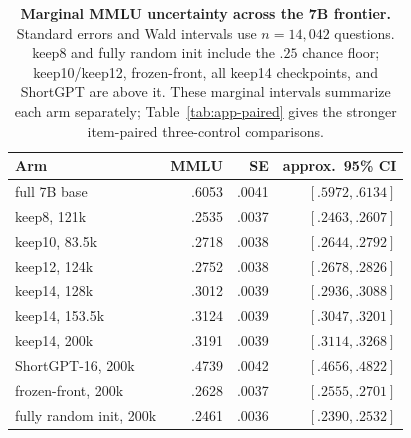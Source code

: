 \begin{table}[t]
\centering
\scriptsize
\setlength{\tabcolsep}{3pt}
\begin{tabular}{@{}lrrr@{}}
\toprule
\textbf{Arm} & \textbf{MMLU} & \textbf{SE} & \textbf{approx.\ 95\% CI} \\
\midrule
full 7B base & .6053 & .0041 & $[.5972,.6134]$ \\
keep8, 121k & .2535 & .0037 & $[.2463,.2607]$ \\
keep10, 83.5k & .2718 & .0038 & $[.2644,.2792]$ \\
keep12, 124k & .2752 & .0038 & $[.2678,.2826]$ \\
keep14, 128k & .3012 & .0039 & $[.2936,.3088]$ \\
keep14, 153.5k & .3124 & .0039 & $[.3047,.3201]$ \\
keep14, 200k & .3191 & .0039 & $[.3114,.3268]$ \\
ShortGPT-16, 200k & .4739 & .0042 & $[.4656,.4822]$ \\
frozen-front, 200k & .2628 & .0037 & $[.2555,.2701]$ \\
fully random init, 200k & .2461 & .0036 & $[.2390,.2532]$ \\
\bottomrule
\end{tabular}
\caption{\textbf{Marginal MMLU uncertainty across the 7B frontier.} Standard
errors and Wald intervals use $n=14{,}042$ questions. keep8 and
fully random init include the $.25$ chance floor; keep10/keep12,
frozen-front, all keep14 checkpoints, and ShortGPT are above it. These marginal intervals summarize each
arm separately; Table~\ref{tab:app-paired} gives the stronger item-paired
three-control comparisons.}
\label{tab:app-mmlu-ci}
\end{table}
